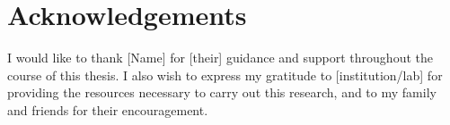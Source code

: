 
\chapter*{Acknowledgements}


I would like to thank [Name] for [their] guidance and support throughout the course of this thesis. I also wish to express my gratitude to [institution/lab] for providing the resources necessary to carry out this research, and to my family and friends for their encouragement.
